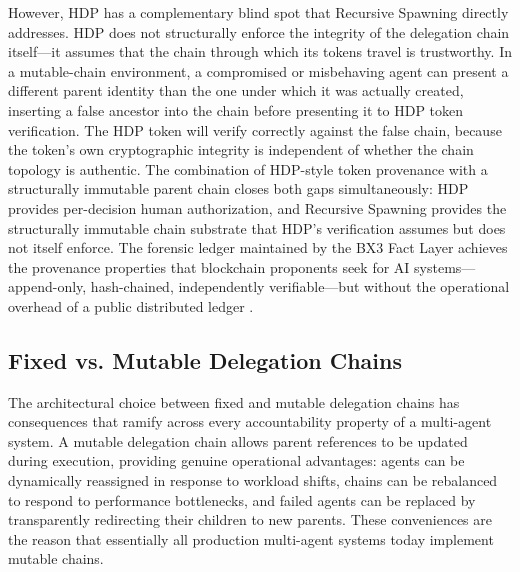 However, HDP has a complementary blind spot that Recursive Spawning directly addresses. HDP does not structurally enforce the integrity of the delegation chain itself---it assumes that the chain through which its tokens travel is trustworthy. In a mutable-chain environment, a compromised or misbehaving agent can present a different parent identity than the one under which it was actually created, inserting a false ancestor into the chain before presenting it to HDP token verification. The HDP token will verify correctly against the false chain, because the token's own cryptographic integrity is independent of whether the chain topology is authentic. The combination of HDP-style token provenance with a structurally immutable parent chain closes both gaps simultaneously: HDP provides per-decision human authorization, and Recursive Spawning provides the structurally immutable chain substrate that HDP's verification assumes but does not itself enforce. The forensic ledger maintained by the BX3 Fact Layer achieves the provenance properties that blockchain proponents seek for AI systems---append-only, hash-chained, independently verifiable---but without the operational overhead of a public distributed ledger \cite{on_chain_provenance_ai,bx3framework}.

\subsection{Fixed vs. Mutable Delegation Chains}\label{sec:fixed-v-mutable}

The architectural choice between fixed and mutable delegation chains has consequences that ramify across every accountability property of a multi-agent system. A mutable delegation chain allows parent references to be updated during execution, providing genuine operational advantages: agents can be dynamically reassigned in response to workload shifts, chains can be rebalanced to respond to performance bottlenecks, and failed agents can be replaced by transparently redirecting their children to new parents. These conveniences are the reason that essentially all production multi-agent systems today implement mutable chains.

